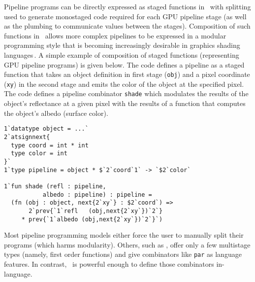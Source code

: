 Pipeline programs can be directly expressed as staged functions in \lang\, with splitting 
used to generate monostaged code required for each GPU pipeline stage
(as well as the plumbing to communicate values between the stages).
Composition of such functions in \lang\ allows more complex pipelines to be expressed in a modular programming style
that is becoming increasingly desirable in graphics shading languages\,\cite{Foley:2011,He:2014}. A simple example of composition of staged functions (representing GPU pipeline programs) is given below.  The code defines a pipeline as a staged function that takes an object definition in first stage (\texttt{obj}) and a pixel coordinate (\texttt{xy}) in the second stage and emits the color of the object at the specified pixel. The code defines a pipeline combinator \texttt{shade} which modulates the results of the object's reflectance at a given pixel with the results of a function that computes the object's albedo (surface color).  
%
\begin{lstlisting} 
1`datatype object = ...`
2`atsignnext{
  type coord = int * int
  type color = int
}`
1`type pipeline = object * $`2`coord`1` -> `$2`color`

1`fun shade (refl : pipeline,
           albedo : pipeline) : pipeline =
  (fn (obj : object, next{2`xy`} : $2`coord`) =>
       2`prev{`1`refl   (obj,next{2`xy`})`2`}
     * prev{`1`albedo (obj,next{2`xy`})`2`}`)
\end{lstlisting}
%
Most pipeline programming models either force the user to manually split their programs (which harms modularity).
Others, such as \cite{Foley:2011}, offer only a few multistage types (namely, first order functions) and give 
combinators like \texttt{par} as language features.
In contrast, \lang\ is powerful enough to define those combinators in-language.

